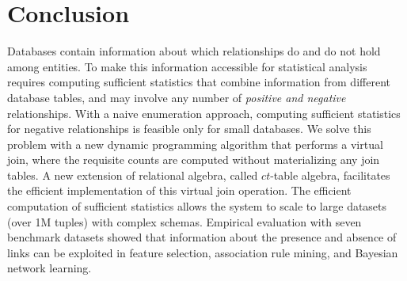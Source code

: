 \documentclass{acm_proc_article-sp}
\newcommand{\ct}{\mathit{ct}}
\begin{document}
\section{Conclusion} \label{sec:conclusion} Databases contain information about which relationships do and do not hold among entities. To make this information accessible for statistical analysis requires computing sufficient statistics  that combine information from different database tables, and may involve any number of {\em positive and negative} relationships. With a naive enumeration approach, computing sufficient statistics for negative relationships is feasible only for small databases. We solve this problem with a new dynamic programming algorithm that performs a virtual join, where the requisite counts are computed without materializing any join tables. 
%
A new extension of relational algebra, called $\ct$-table algebra, facilitates the efficient implementation of this virtual join operation. 
%
The efficient computation of sufficient statistics allows the system to scale to large datasets (over 1M tuples) with complex schemas. Empirical evaluation with seven benchmark datasets showed that information about the presence and absence of links can be exploited in feature selection, association rule mining, and Bayesian network learning. 
\end{document}
